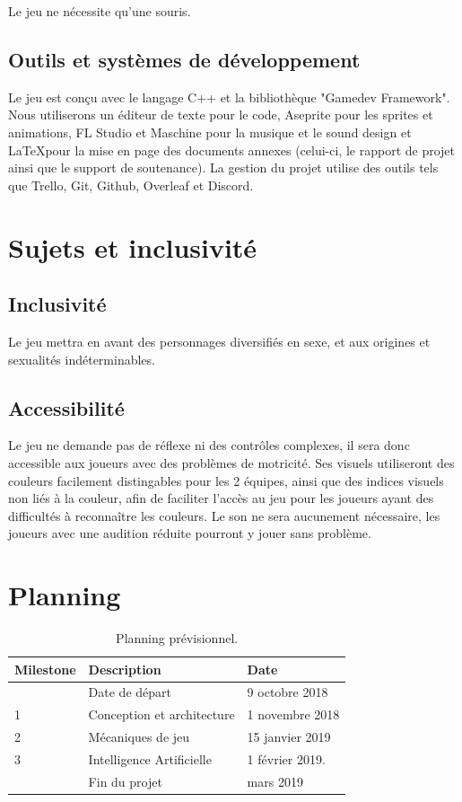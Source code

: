 \documentclass[a4paper]{scrreprt}
\begin{document}
Le jeu ne nécessite qu'une souris.

\section{Outils et systèmes de développement}
Le jeu est conçu avec le langage C++ et la bibliothèque "Gamedev Framework". 
Nous utiliserons un éditeur de texte pour le code, Aseprite pour les sprites et animations, FL Studio et Maschine pour la musique et le sound design et \LaTeX pour la mise en page des documents annexes (celui-ci, le rapport de projet ainsi que le support de soutenance).
La gestion du projet utilise des outils tels que Trello, Git, Github, Overleaf et Discord.



\chapter{Sujets et inclusivité}

\section{Inclusivité}

Le jeu mettra en avant des personnages diversifiés en sexe, et aux origines et sexualités indéterminables.

\section{Accessibilité}
Le jeu ne demande pas de réflexe ni des contrôles complexes, il sera donc accessible aux joueurs avec des problèmes de motricité.
Ses visuels utiliseront des couleurs facilement distingables pour les 2 équipes, ainsi que des indices visuels non liés à la couleur, afin de faciliter l'accès au jeu pour les joueurs ayant des difficultés à reconnaître les couleurs.
Le son ne sera aucunement nécessaire, les joueurs avec une audition réduite pourront y jouer sans problème.



\chapter{Planning}

\begin{table}[h]
\centering
\begin{tabular}{|l|l|l|}
\hline
Milestone & Description & Date \\\hline
& Date de départ & 9 octobre 2018 \\
1 & Conception et architecture  & 1 novembre 2018 \\
2 & Mécaniques de jeu & 15 janvier 2019\\
3 & Intelligence Artificielle & 1 février 2019. \\
& Fin du projet & mars 2019 \\
\hline
\end{tabular}
\caption{\label{tab:schedule}Planning prévisionnel.}
\end{table}
\end{document}
